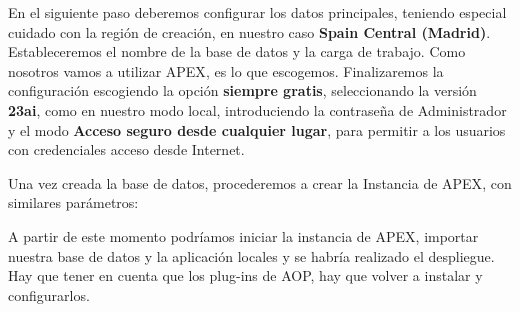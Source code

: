 En el siguiente paso deberemos configurar los datos principales, teniendo especial cuidado con la región de creación, en nuestro caso \textbf{Spain Central (Madrid)}.
Estableceremos el nombre de la base de datos y la carga de trabajo. Como nosotros vamos a utilizar \acrshort{APEX}, es lo que escogemos.
Finalizaremos la configuración escogiendo la opción \textbf{siempre gratis}, seleccionando la versión \textbf{23ai}, como en nuestro modo local, introduciendo la contraseña de Administrador y el modo \textbf{Acceso seguro desde cualquier lugar}, para permitir a los usuarios con credenciales acceso desde Internet.

Una vez creada la base de datos, procederemos a crear la Instancia de \acrshort{APEX}, con similares parámetros:


A partir de este momento podríamos iniciar la instancia de \acrshort{APEX}, importar nuestra base de datos y la aplicación locales y se habría realizado el despliegue. Hay que tener en cuenta que los plug-ins de \acrshort{AOP}, hay que volver a instalar y configurarlos. 